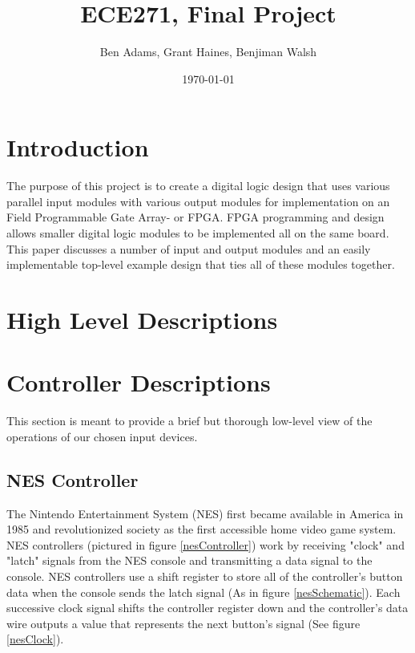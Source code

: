 \documentclass[a4paper]{article}
\title{ECE271, Final Project}
\author{Ben Adams, Grant Haines, Benjiman Walsh}
\date{\today}
\begin{document}
\maketitle

\pagebreak

\tableofcontents

\section{Introduction}

The purpose of this project is to create a digital logic design that uses various parallel input modules with various output modules for implementation on an Field Programmable Gate Array- or FPGA. FPGA programming and design allows smaller digital logic modules to be implemented all on the same board. This paper discusses a number of input and output modules and an easily implementable top-level example design that ties all of these modules together. 


\section{High Level Descriptions}%


\section{Controller Descriptions}

This section is meant to provide a brief but thorough low-level view of the operations of our chosen input devices. 

\subsection{NES Controller}

The Nintendo Entertainment System (NES) first became available in America in 1985 and revolutionized society as the first accessible home video game system. NES controllers (pictured in figure \ref{nesController}) work by receiving "clock" and "latch" signals from the NES console and transmitting a data signal to the console. NES controllers use a shift register to store all of the controller's button data when the console sends the latch signal (As in figure \ref{nesSchematic}). Each successive clock signal shifts the controller register down and the controller's data wire outputs a value that represents the next button's signal (See figure \ref{nesClock}). 
\end{document}
